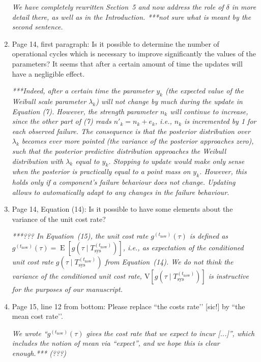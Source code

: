 \documentclass[authoryear]{elsarticle}
\newcommand{\E}{\operatorname{E}}
\def\tnow{t_\text{now}}
\newcommand{\Tsysnow}{T^{(t_\text{now})}_\text{sys}}
\newcommand{\gnow}{g^{(\tnow)}}
\begin{document}
\begin{enumerate}
\smallskip

\emph{We have completely rewritten Section~5 and now address the role of $\delta$ in more detail there, as well as in the Introduction.
***not sure what is meant by the second sentence.}

\item Page 14, first paragraph: Is it possible to determine the number of operational cycles which is necessary to improve significantly the values of the parameters? It seems that after a certain amount of time the updates will have a negligible effect. 

\smallskip

\emph{***Indeed, after a certain time the parameter $y_k$ (the expected value of the Weibull scale parameter $\lambda_k$)
will not change by much during the update in Equation (7).
However, the strength parameter $n_k$ will continue to increase,
since the other part of (7) reads $n'_k = n_k + e_k$, i.e.,
$n_k$ is incremented by 1 for each observed failure.
The consequence is that the posterior distribution over $\lambda_k$ becomes ever more pointed
(the variance of the posterior approaches zero),
such that the posterior predictive distribution approaches the Weibull distribution with $\lambda_k$ equal to $y_k$.
Stopping to update would make only sense when the posterior is practically equal to a point mass on $y_k$.
However, this holds only if a component's failure behaviour does not change.
Updating allows to automatically adapt to any changes in the failure behaviour.}

\item Page 14, Equation (14): Is it possible to have some elements about the variance of the unit cost rate?

\smallskip

\emph{***??? In Equation~(15), the unit cost rate $\gnow(\tau)$ is defined as
$\gnow(\tau) = \E[g(\tau \mid \Tsysnow)]$,
i.e., as expectation of the conditioned unit cost rate $g(\tau \mid \Tsysnow)$ from Equation~(14).
We do not think the variance of the conditioned unit cost rate,
$\text{V}[g(\tau \mid \Tsysnow)]$ is instructive for the purposes of our manuscript.}

\item Page 15, line 12 from bottom: Please replace ``the costs rate’’ [sic!] by ``the mean cost rate’’.

\smallskip

\emph{We wrote ``$\gnow(\tau)$ gives the cost rate that we expect to incur [...]'',
which includes the notion of mean via ``expect'', and we hope this is clear enough.*** (???)}
\end{enumerate}
\end{document}
